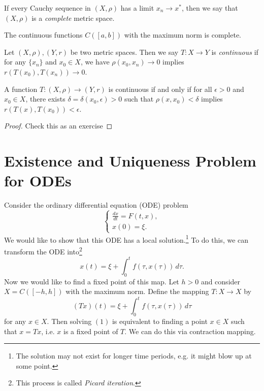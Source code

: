 \begin{definition}
  If every Cauchy sequence in $(X, \rho)$
  has a limit $x_n \to x^*$, then we say that
  $(X, \rho)$ is a \emph{complete} metric space.
\end{definition}

\begin{example}
  The continuous functions $C([a, b])$ with the maximum
  norm is complete.
\end{example}

\begin{definition}
  Let $(X, \rho), (Y, r)$ be
  two metric spaces. Then we say $T : X \to Y$ is
  \emph{continuous} if for any $\{x_n\}$ and $x_0 \in X$,
  we have
  $\rho(x_0, x_n) \to 0$ implies
  $r(T(x_0), T(x_n)) \to 0$.
\end{definition}

\begin{theorem}
  A function $T : (X, \rho) \to (Y, r)$ is continuous
  if and only if for all $\epsilon > 0$ and $x_0 \in X$,
  there exists $\delta = \delta(x_0, \epsilon) > 0$
  such that $\rho(x, x_0) < \delta$ implies
  $r(T(x), T(x_0)) < \epsilon$.
\end{theorem}

\begin{proof}
  Check this as an exercise
\end{proof}

\section{Existence and Uniqueness Problem for ODEs}

Consider the ordinary differential equation (ODE) problem
\[
  \begin{cases}
    \frac{dx}{dt} = F(t, x), \\
    x(0) = \xi.
  \end{cases} \tag{1}
\]
We would like to show that this ODE has a local solution.\footnote{The solution may not exist for longer time periods, e.g. it might blow up at some point.}
To do this, we can transform the ODE into\footnote{This process is called \emph{Picard iteration}.}
\[
  x(t) = \xi + \int_0^t f(\tau, x(\tau))\, d\tau.
\]
Now we would like to find a fixed point of this map.
Let $h > 0$ and consider $X = C([-h, h])$ with the
maximum norm. Define the mapping $T : X \to X$ by
\[
  (Tx)(t) = \xi + \int_0^t f(\tau, x(\tau))\, d\tau
\]
for any $x \in X$. Then solving $(1)$ is equivalent
to finding a point $x \in X$ such that $x = Tx$, i.e.
$x$ is a fixed point of $T$. We can do this via
contraction mapping.

